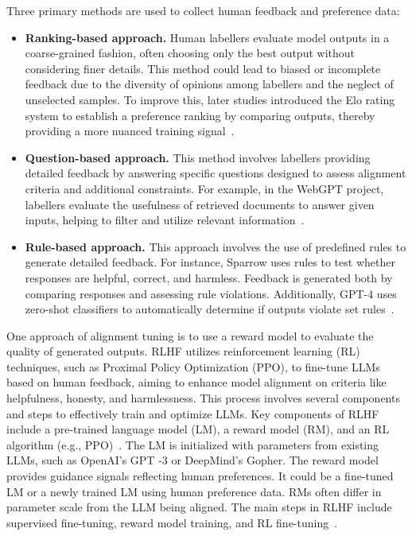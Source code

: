 Three primary methods are used to collect human feedback and preference data:
\begin{itemize}
	\item \textbf{Ranking-based approach.} {
		      Human labellers evaluate model outputs in a coarse-grained fashion, often choosing only the best output without considering finer details. This method could lead to biased or incomplete feedback due to the diversity of opinions among labellers and the neglect of unselected samples. To improve this, later studies introduced the Elo rating system to establish a preference ranking by comparing outputs, thereby providing a more nuanced training signal~\cite{glaese2022improving, ziegler2019fine}.
	      }
	\item \textbf{Question-based approach.} {
		      This method involves labellers providing detailed feedback by answering specific questions designed to assess alignment criteria and additional constraints. For example, in the WebGPT project, labellers evaluate the usefulness of retrieved documents to answer given inputs, helping to filter and utilize relevant information~\cite{nakano2021webgpt}.
	      }
	\item \textbf{Rule-based approach.} {
		      This approach involves the use of predefined rules to generate detailed feedback. For instance, Sparrow uses rules to test whether responses are helpful, correct, and harmless. Feedback is generated both by comparing responses and assessing rule violations. Additionally, GPT-4 uses zero-shot classifiers to automatically determine if outputs violate set rules~\cite{glaese2022improving, radford2023gpt4}.
	      }
\end{itemize}

One approach of alignment tuning is to use a reward model to evaluate the quality of generated outputs.
RLHF utilizes reinforcement learning (RL) techniques, such as Proximal Policy Optimization (PPO), to fine-tune LLMs based on human feedback, aiming to enhance model alignment on criteria like helpfulness, honesty, and harmlessness.
This process involves several components and steps to effectively train and optimize LLMs.
Key components of RLHF include a pre-trained language model (LM), a reward model (RM), and an RL algorithm (e.g., PPO)~\cite{survey}.
The LM is initialized with parameters from existing LLMs, such as OpenAI's GPT -3 or DeepMind's Gopher.
The reward model provides guidance signals reflecting human preferences. It could be a fine-tuned LM or a newly trained LM using human preference data.
RMs often differ in parameter scale from the LLM being aligned.
The main steps in RLHF include supervised fine-tuning, reward model training, and RL fine-tuning~\cite{survey}.

